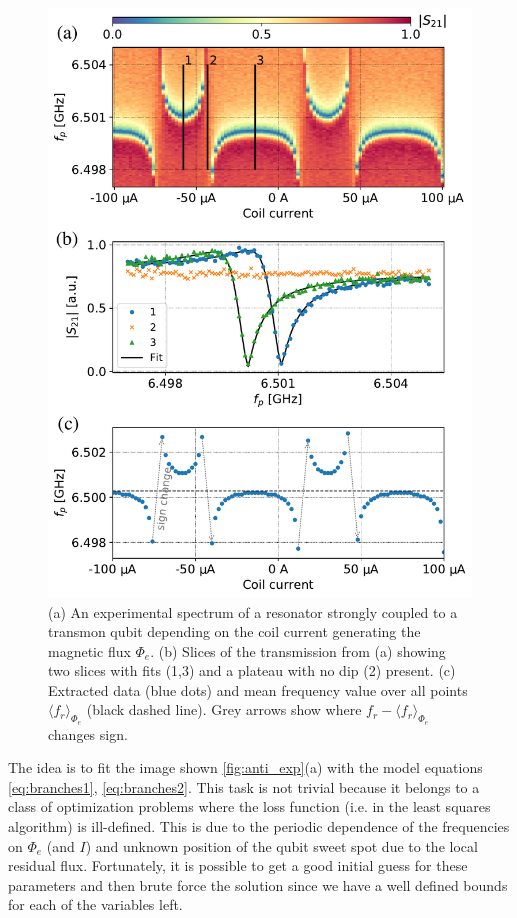 \documentclass[%
 aip,
 amsmath,amssymb,
 reprint,%
]{revtex4-1}
\begin{document}
\begin{figure}[h!]
\includegraphics[width=\linewidth]{anti_subplots}
\caption{(a) An experimental spectrum of a resonator strongly coupled to a transmon qubit depending on the coil current generating the magnetic flux $\Phi_e$. (b) Slices of the transmission from (a) showing two slices with fits (1,3) and a plateau with no dip (2) present. (c) Extracted data (blue dots) and mean frequency value over all points $\langle f_r \rangle_{\Phi_e}$ (black dashed line). Grey arrows show where $f_r - \langle f_r \rangle_{\Phi_e}$ changes sign.}
\label{fig:anti_exp}
\end{figure}

The idea is to fit the image shown \autoref{fig:anti_exp}(a) with the model equations \eqref{eq:branches1}, \eqref{eq:branches2}. This task is not trivial because  it belongs to a class of optimization problems where the loss function (i.e. in the least squares algorithm) is ill-defined. This is due to the periodic dependence of the frequencies on $\Phi_e$ (and $I$) and unknown position of the qubit sweet spot due to the local residual flux. Fortunately, it is possible to get a good initial guess for these parameters and then brute force the solution since we have a well defined bounds for each of the variables left. 
\end{document}
